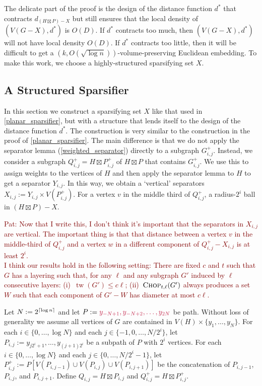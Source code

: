 \documentclass{patmorin}
\makeatletter
\renewcommand{\le}{\leqslant}
\newcommand{\pat}[1]{\textcolor{Maroon}{Pat: #1}}
\def\mathcolor#1#{\@mathcolor{#1}}
\def\@mathcolor#1#2#3{%
  \protect\leavevmode
  \begingroup
    \color#1{#2}#3%
  \endgroup
}
\newcommand{\mathdefin}[1]{\mathcolor{brightmaroon}{#1}}
\DeclareMathOperator{\tw}{tw}
\makeatother
\begin{document}
The delicate part of the proof is the design of the distance function $d^*$ that contracts $d_{(H\boxtimes P)-X}$ but still ensures that the local density of $(V(G-X),d^*)$ is $O(D)$. If $d^*$ contracts too much, then $(V(G-X),d^*)$ will not have local density $O(D)$. If $d^*$ contracts too little, then it will be difficult to get a $(k,O(\sqrt{\log n}))$-volume-preserving Euclidean embedding. To make this work, we choose a highly-structured sparsifying set $X$.

\subsection{A Structured Sparsifier}

In this section we construct a sparsifying set $X$ like that used in \cref{planar_sparsifier}, but with a structure that lends itself to the design of the distance function $d^*$.  The construction is very similar to the construction in the proof of \cref{planar_sparsifier}. The main difference is that we do not apply the separator lemma (\cref{weighted_separator}) directly to a subgraph $G^+_{i,j}$.  Instead, we consider a subgraph $Q^+_{i,j}=H\boxtimes P^+_{i,j}$ of $H\boxtimes P$ that contains $G^+_{i,j}$.  We use this to assign weights to the vertices of $H$ and then apply the separator lemma to $H$ to get a separator $Y_{i,j}$.  In this way, we obtain a `vertical' separators $X_{i,j}:=Y_{i,j}\times V(P^+_{i,j})$.
For a vertex $v$ in the middle third of $Q^+_{i,j}$, a radius-$2^i$ ball in $(H\boxtimes P)-X$.


\pat{Now that I write this, I don't think it's important that the separators in $X_{i,j}$ are vertical.  The important thing is that that distance between a vertex $v$ in the middle-third of $Q^+_{i,j}$ and a vertex $w$ in a different component of $Q^+_{i,j}-X_{i,j}$ is at least $2^i$.  \\[2ex]
I think our results hold in the following setting:
 There are fixed $c$ and $t$ such that
 $G$ has a layering such that, for any $\ell$ and any subgraph $G'$ induced by $\ell$ consecutive layers:  (i)~$\tw(G')\le c\ell$;
 (ii)~$\textsc{Chop}_{t,\ell}(G')$ always produces a set $W$ such that each component of $G'-W$ has diameter at most $c\ell$.
 }


Let $N:=2^{{\lceil \log n \rceil}}$ and let $P:=\mathdefin{y_{-N+1},y_{-N+2},\ldots,y_{2N}}$ be path.  Without loss of generality we assume all vertices of $G$ are contained in $V(H)\times\{y_1,\ldots,y_N\}$.  For each $i\in\{0,\ldots,\log N\}$ and each $j\in\{-1,0,\ldots,N/2^{i}\}$, let $P_{i,j}:=y_{j2^i+1},\ldots,y_{(j+1)2^i}$ be a subpath of $P$ with $2^i$ vertices. For each $i\in\{0,\ldots,\log N\}$ and each $j\in\{0,\ldots,N/2^{i}-1\}$, let $P^+_{i,j}:=P[V(P_{i,j-1})\cup V(P_{i,j})\cup V(P_{i,j+1})]$ be the concatenation of $P_{i,j-1}$, $P_{i,j}$, and $P_{i,j+1}$. Define $Q_{i,j}=H\boxtimes P_{i,j}$ and $Q^+_{i,j}=H\boxtimes P^+_{i,j}$.
\end{document}
